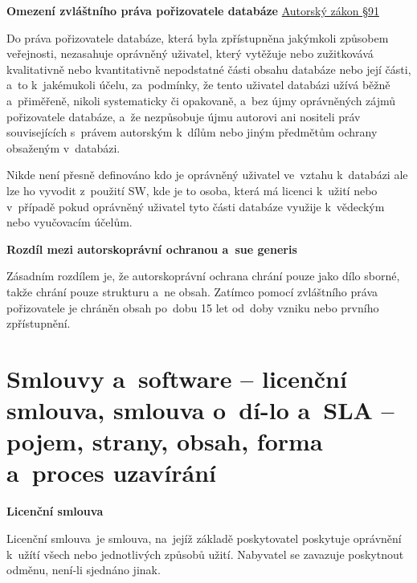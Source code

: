 \textbf{Omezení zvláštního práva pořizovatele databáze} \href{https://www.zakonyprolidi.cz/cs/2000-121#p91}{Autorský zákon §91}

Do práva pořizovatele databáze, která byla zpřístupněna jakýmkoli způsobem veřejnosti, nezasahuje oprávněný uživatel, který vytěžuje nebo zužitkovává kvalitativně nebo kvantitativně nepodstatné části obsahu databáze nebo její části, a~to k~jakémukoli účelu, za~podmínky, že tento uživatel databázi užívá běžně a~přiměřeně, nikoli systematicky či opakovaně, a~bez újmy oprávněných zájmů pořizovatele databáze, a~že nezpůsobuje újmu autorovi ani nositeli práv souvisejících s~právem autorským k~dílům nebo jiným předmětům ochrany obsaženým v~databázi.

Nikde není přesně definováno kdo je oprávněný uživatel ve~vztahu k~databázi ale lze ho vyvodit z~použití SW, kde je to osoba, která má licenci k~užití nebo v~případě pokud oprávněný uživatel tyto části databáze využije k~vědeckým nebo vyučovacím účelům.

\vspace{0.3cm}
\begin{Large}
\textbf{Rozdíl mezi autorskoprávní ochranou a~sue generis}
\end{Large}

Zásadním rozdílem je, že autorskoprávní ochrana chrání pouze jako dílo sborné, takže chrání pouze strukturu a~ne obsah. Zatímco pomocí zvláštního práva pořizovatele je chráněn obsah po~dobu 15 let od~doby vzniku nebo prvního zpřístupnění.











\clearpage
\section[Smlouvy a~software -- licenční smlouva, smlouva o~dílo a~SLA -- pojem, strany, obsah, forma a~proces uzavírání]{Smlouvy a~software -- licenční smlouva, smlouva o~dí-lo a~SLA -- pojem, strany, obsah, forma a~proces uzavírání}

\begin{Large}
\textbf{Licenční smlouva}
\end{Large}

Licenční smlouva~je smlouva, na~jejíž základě poskytovatel poskytuje oprávnění k~užítí všech nebo jednotlivých způsobů užití. Nabyvatel se zavazuje poskytnout odměnu, není-li sjednáno jinak.


